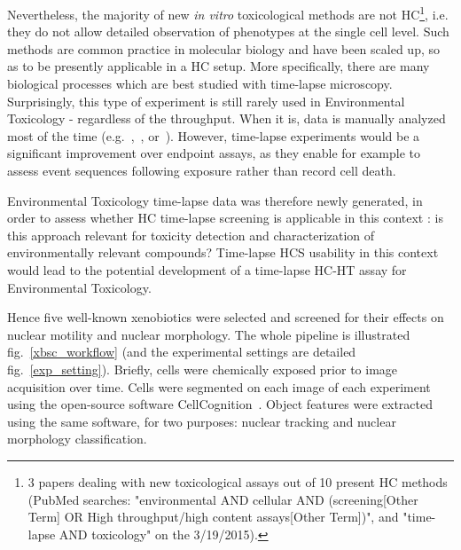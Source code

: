 Nevertheless, the majority of new \textit{in vitro} toxicological methods are not HC\footnote{3 papers dealing with new toxicological assays out of 10 present HC methods (PubMed searches: "environmental AND cellular AND (screening[Other Term] OR High throughput/high content assays[Other Term])", and "time-lapse AND toxicology" on the 3/19/2015).}, i.e. they do not allow detailed observation of phenotypes at the single cell level. Such methods are common practice in molecular biology and have been scaled up, so as to be presently applicable in a HC setup. More specifically, there are many biological processes which are best studied with time-lapse microscopy. Surprisingly, this type of experiment is still rarely used in Environmental Toxicology - regardless of the throughput. When it is, data is manually analyzed most of the time (e.g.~\cite{pmid17949680},~\cite{pmid15388243}, or~\cite{pmid24263567}). However, time-lapse experiments would be a significant improvement over endpoint assays, as they enable for example to assess event sequences following exposure rather than record cell death. 


Environmental Toxicology time-lapse data was therefore newly generated, in order to assess whether HC time-lapse screening is applicable in this context : is this approach relevant for toxicity detection and characterization of environmentally relevant compounds? Time-lapse HCS usability in this context would lead to the potential development of a time-lapse HC-HT assay for Environmental Toxicology. %

Hence five well-known xenobiotics were selected and screened for their effects on nuclear motility and nuclear morphology. The whole pipeline is illustrated fig.~\ref{xbsc_workflow} (and the experimental settings are detailed fig.~\ref{exp_setting}). Briefly, cells were chemically exposed prior to image acquisition over time. Cells were segmented on each image of each experiment using the open-source software CellCognition~\cite{cellcognition}. Object features were extracted using the same software, for two purposes: nuclear tracking and nuclear morphology classification. 

